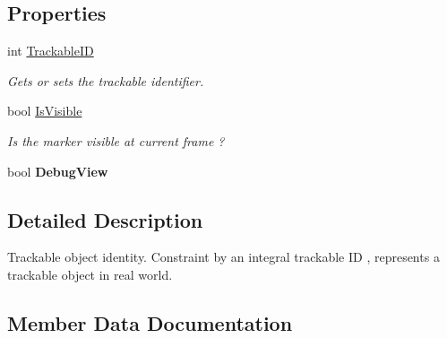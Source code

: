 \subsection*{Properties}
\begin{DoxyCompactItemize}
\item 
int \mbox{\hyperlink{class_ximmerse_1_1_rhino_x_1_1_trackable_identity_a271412a107c63cfd093732698616f331}{Trackable\+ID}}
\begin{DoxyCompactList}\small\item\em Gets or sets the trackable identifier. \end{DoxyCompactList}\item 
bool \mbox{\hyperlink{class_ximmerse_1_1_rhino_x_1_1_trackable_identity_a6265ce8a7d68c19fef42587c574a6981}{Is\+Visible}}
\begin{DoxyCompactList}\small\item\em Is the marker visible at current frame ? \end{DoxyCompactList}\item 
\mbox{\label{class_ximmerse_1_1_rhino_x_1_1_trackable_identity_ac5429b9063cf720fccfb564c1cfe58be}} 
bool {\bfseries Debug\+View}
\end{DoxyCompactItemize}


\subsection{Detailed Description}
Trackable object identity. Constraint by an integral trackable ID , represents a trackable object in real world. 



\subsection{Member Data Documentation}
\mbox{\label{class_ximmerse_1_1_rhino_x_1_1_trackable_identity_a586dc1b3013620e375e7887485b5ae13}} 
